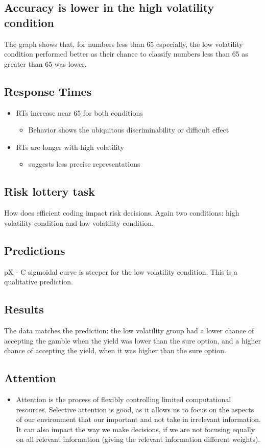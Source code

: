 \subsection{Accuracy is lower in the high volatility condition}
The graph shows that, for numbers less than 65 especially, the low volatility condition performed better as their chance to classify numbers less than 65 as greater than 65 was lower.

\subsection{Response Times}
\begin{itemize}
    \item RTs increase near 65 for both conditions
    \begin{itemize}
        \item Behavior shows the ubiquitous discriminability or difficult effect
    \end{itemize}
    \item RTs are longer with high volatility
    \begin{itemize}
        \item suggests less precise representations
    \end{itemize}
\end{itemize}

\subsection{Risk lottery task}
How does efficient coding impact risk decisions.
Again two conditions: high volatility condition and low volatility condition.
\subsection{Predictions}
pX - C sigmoidal curve is steeper for the low volatility condition. This is a qualitative prediction.
\subsection{Results}
The data matches the prediction: the low volatility group had a lower chance of accepting the gamble when the yield was lower than the sure option, and a higher chance of accepting the yield, when it was higher than the sure option.
\subsection{Attention}
\begin{itemize}
    \item Attention is the process of flexibly controlling limited computational resources. Selective attention is good, as it allows us to focus on the aspects of our environment that our important and not take in irrelevant information. It can also impact the way we make decisions, if we are not focusing equally on all relevant information (giving the relevant information different weights).
\end{itemize}
